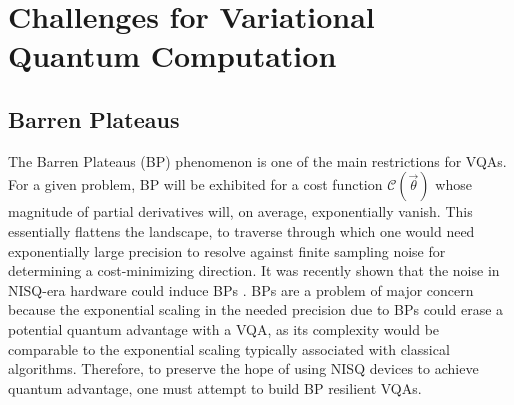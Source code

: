 \section{Challenges for Variational Quantum Computation}


\subsection{Barren Plateaus}
The Barren Plateaus (BP) phenomenon is one of the main restrictions for VQAs. For a given problem, BP will be exhibited for a cost function $\mathcal{C}(\vec{\theta})$ whose magnitude of partial derivatives will, on average, exponentially vanish. This essentially flattens the landscape, to traverse through which one would need exponentially large precision to resolve against finite sampling noise for determining a cost-minimizing direction. It was recently shown that the noise in NISQ-era hardware could induce BPs \cite{2020arXiv200714384W}. BPs are a problem of major concern because the exponential scaling in the needed precision due to BPs could erase a potential quantum advantage with a VQA, as its complexity would be comparable to the exponential scaling typically associated with classical algorithms. Therefore, to preserve the hope of using NISQ devices to achieve quantum advantage, one must attempt to build BP resilient VQAs.  

